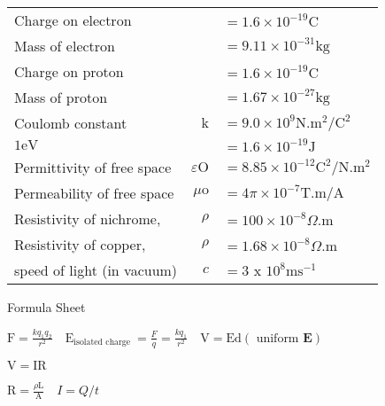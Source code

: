\documentclass{extarticle}
\begin{document}
\begin{tabularx}{\textwidth}{@{}X@{}r@{}l@{}}

Charge on electron & & $=1.6 \times 10^{-19} \mathrm{C} \quad$ \\

Mass of electron & & $=9.11 \times 10^{-31} \mathrm{kg}$ \\

Charge on proton & & $=1.6 \times 10^{-19} \mathrm{C} \quad$ \\

Mass of proton & & $=1.67 \times 10^{-27} \mathrm{kg}$ \\

Coulomb constant & $\mathrm{k}$ & $=9.0 \times 10^{9} \mathrm{N} . \mathrm{m}^{2} / \mathrm{C}^{2}$ \\

$1 \mathrm{eV}$ & & $=1.6 \times 10^{-19} \mathrm{J}$ \\

Permittivity of free space & $\varepsilon \mathrm{O}$ & $=8.85 \times 10^{-12} \mathrm{C}^{2} / \mathrm{N} . \mathrm{m}^{2}$ \\

Permeability of free space & $\mu \mathrm{o}$ & $=4 \pi \times 10^{-7} \mathrm{T} . \mathrm{m} / \mathrm{A}$ \\

Resistivity of nichrome, & $\rho$ & $=100 \times 10^{-8} \Omega . \mathrm{m}$ \\

Resistivity of copper, & $\rho$ & $=1.68 \times 10^{-8} \Omega . \mathrm{m}$ \\

speed of light (in vacuum) & $c$ & $=3$ x $10^{8} \mathrm{ms}^{-1}$ \\

\end{tabularx}

\markEnd

\markStart[100]


Formula Sheet

$\mathrm{F}=\frac{k q_{1} q_{2}}{r^{2}} \quad \mathrm{E}_{\text {isolated charge }}=\frac{F}{q}=\frac{k q_{1}}{r^{2}} \quad \mathrm{V}=\mathrm{Ed}(\text { uniform } \mathbf{E})$

$\mathrm{V}=\mathrm{IR}$

$\mathrm{R}=\frac{\rho \mathrm{L}}{\mathrm{A}} \quad I=Q / t$
\end{document}

